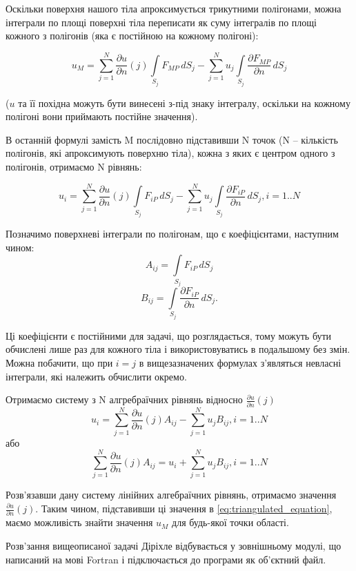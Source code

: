 \documentclass[a4paper,12pt]{article}
\begin{document}
Оскільки поверхня нашого тіла апроксимується трикутними полігонами, можна інтеграли по площі поверхні тіла переписати як суму інтегралів по площі кожного з полігонів (яка є постійною на кожному полігоні):

\begin{equation} \label{eq:triangulated_equation}
u_M = \sum_{j=1}^{N} \frac{\partial u}{\partial n}(j) \int\limits_{S_j} F_{MP} \, dS_j - \sum_{j=1}^{N} u_j \int\limits_{S_j} \frac{\partial F_{MP}}{\partial n} \, dS_j
\end{equation}

($u$ та її похідна можуть бути винесені з-під знаку інтегралу, оскільки на кожному полігоні вони приймають постійне значення).

В останній формулі замість M послідовно підставивши N точок (N -- кількість полігонів, які апроксимують поверхню тіла), кожна з яких є центром одного з полігонів, отримаємо N рівнянь:

\[
u_i = \sum_{j=1}^{N} \frac{\partial u}{\partial n}(j) \int\limits_{S_j} F_{iP} \, dS_j - \sum_{j=1}^{N} u_j \int\limits_{S_j} \frac{\partial F_{iP}}{\partial n} \, dS_j, i = 1..N
\]

Позначимо поверхневі інтеграли по полігонам, що є коефіцієнтами, наступним чином:
\[A_{ij} = \int\limits_{S_j} F_{iP} \, dS_j\]
\[B_{ij} = \int\limits_{S_j} \frac{\partial F_{iP}}{\partial n} \, dS_j.\]

Ці коефіцієнти є постійними для задачі, що розглядається, тому можуть бути обчислені лише раз для кожного тіла і використовуватись в подальшому без змін. Можна побачити, що при $i = j$ в вищезазначених формулах з’являться невласні інтеграли, які належить обчислити окремо.

Отримаємо систему з N алгребраїчних рівнянь відносно $\frac{\partial u}{\partial n}(j)$
\[
u_i = \sum_{j=1}^{N} \frac{\partial u}{\partial n}(j) A_{ij} - \sum_{j=1}^{N} u_j B_{ij}, i = 1..N
\]
або
\[
\sum_{j=1}^{N} \frac{\partial u}{\partial n}(j) A_{ij} = u_i + \sum_{j=1}^{N} u_j B_{ij}, i = 1..N
\]

Розв’язавши дану систему лінійних алгебраїчних рівнянь, отримаємо значення $\frac{\partial u}{\partial n}(j)$. Таким чином, підставивши ці значення в \ref{eq:triangulated_equation}, маємо можливість знайти значення $u_M$ для будь-якої точки області.

Розв’зання вищеописаної задачі Діріхле відбувається у зовнішньому модулі, що написаний на мові Fortran і підключається до програми як об’єктний файл.
\end{document}
